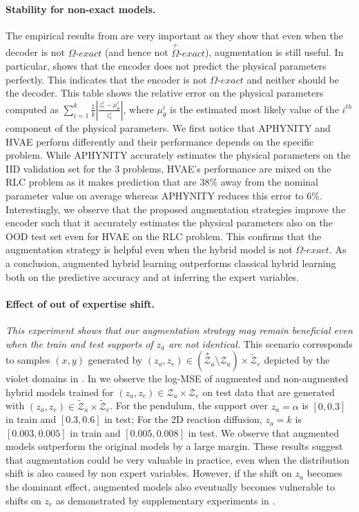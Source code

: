 \paragraph{Stability for non-exact models.}
The empirical results from  are very important as they show that even when the decoder is not $\Omega\textit{-exact}$ (and hence not $\overset{+}{\Omega}\textit{-exact}$), augmentation is still useful. In particular,  shows that the encoder does not predict the physical parameters perfectly. This indicates that the encoder is not $\Omega\textit{-exact}$ and neither should be the decoder. This table shows the relative error on the physical parameters computed as $\sum_{i=1}^k\frac{1}{k}\left|\frac{z_e^i - \mu_\theta^i}{z_e^i}\right|$, where $\mu_\theta^i$ is the estimated most likely value of the $i^{th}$ component of the physical parameters. We first notice that APHYNITY and HVAE perform differently and their performance depends on the specific problem. While APHYNITY accurately estimates the physical parameters on the IID validation set for the 3 problems, HVAE's performance are mixed on the RLC problem as it makes prediction that are $38\%$ away from the nominal parameter value on average whereas APHYNITY reduces this error to $6\%$. Interestingly, we observe that the proposed augmentation strategies improve the encoder such that it accurately estimates the physical parameters also on the OOD test set even for HVAE on the RLC problem. This confirms that the augmentation strategy is helpful even when the hybrid model is not $\Omega\textit{-exact}$. As a conclusion, augmented hybrid learning outperforms classical hybrid learning both on the predictive accuracy and at inferring the expert variables.

\paragraph{Effect of out of expertise shift.}
\textit{This experiment shows that our augmentation strategy may remain beneficial even when the train and test supports of $z_a$ are not identical.} This scenario corresponds to samples $(x, y)$ generated by $(z_a, z_e) \in (\overset{\ast}{\mathcal{Z}}_a \setminus \mathcal{Z}_a) \times \tilde{\mathcal{Z}}_e$ depicted by the violet domains in . In  we observe the log-MSE of augmented and non-augmented hybrid models trained for $(z_a, z_e) \in \mathcal{Z}_a \times \mathcal{Z}_e$ on test data that are generated with $(z_a, z_e) \in \tilde{\mathcal{Z}}_a \times \tilde{\mathcal{Z}}_e$. For the pendulum, the support over $z_a=\alpha$ is $\left[0, 0.3\right]$ in train and $\left[0.3, 0.6\right]$ in test; For the 2D reaction diffusion, $z_a=k$ is $\left[0.003, 0.005\right]$ in train and $\left[0.005, 0.008\right]$ in test. We observe that augmented models outperform the original models by a large margin. These results suggest that augmentation could be very valuable in practice, even when the distribution shift is also caused by non expert variables. However, if the shift on $z_a$ becomes the dominant effect, augmented models also eventually becomes vulnerable to shifts on $z_e$ as demonstrated by supplementary experiments in .

